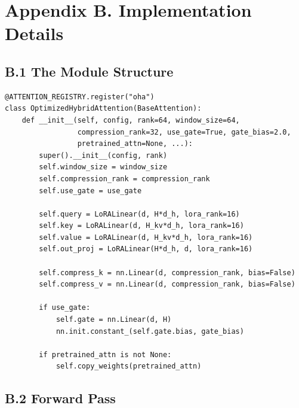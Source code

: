 
\section{Appendix B. Implementation Details}

\subsection{B.1 The Module Structure}

\begin{lstlisting}
@ATTENTION_REGISTRY.register("oha")
class OptimizedHybridAttention(BaseAttention):
    def __init__(self, config, rank=64, window_size=64,
                 compression_rank=32, use_gate=True, gate_bias=2.0,
                 pretrained_attn=None, ...):
        super().__init__(config, rank)
        self.window_size = window_size
        self.compression_rank = compression_rank
        self.use_gate = use_gate
        
        self.query = LoRALinear(d, H*d_h, lora_rank=16)
        self.key = LoRALinear(d, H_kv*d_h, lora_rank=16)
        self.value = LoRALinear(d, H_kv*d_h, lora_rank=16)
        self.out_proj = LoRALinear(H*d_h, d, lora_rank=16)
        
        self.compress_k = nn.Linear(d, compression_rank, bias=False)
        self.compress_v = nn.Linear(d, compression_rank, bias=False)
        
        if use_gate:
            self.gate = nn.Linear(d, H)
            nn.init.constant_(self.gate.bias, gate_bias)
        
        if pretrained_attn is not None:
            self.copy_weights(pretrained_attn)
\end{lstlisting}

\subsection{B.2 Forward Pass}

